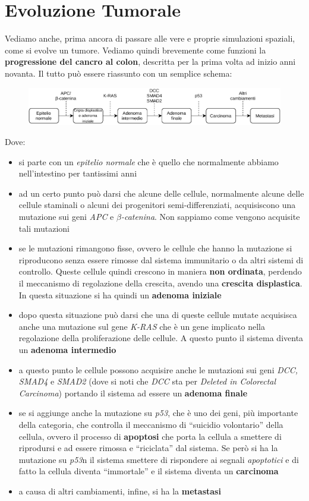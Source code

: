\documentclass[a4paper,12pt, oneside]{book}
\begin{document}
\section{Evoluzione Tumorale}
Vediamo anche, prima ancora di passare alle vere e proprie simulazioni spaziali,
come si evolve un tumore. Vediamo quindi brevemente come funzioni la
\textbf{progressione del cancro al colon}, descritta per la prima volta ad
inizio anni novanta. Il tutto può essere riassunto con un semplice schema:
\begin{figure}[H]
  \centering
  \includegraphics[scale = 0.8]{img/canc.pdf}
\end{figure}
Dove:
\begin{itemize}
  \item si parte con un \textit{epitelio normale} che è quello che normalmente
  abbiamo nell'intestino per tantissimi anni
  \item ad un certo punto può darsi che alcune delle cellule, normalmente alcune
  delle cellule staminali o alcuni dei progenitori semi-differenziati,
  acquisiscono una mutazione sui geni \textit{APC} e
  $\beta$\textit{-catenina}. Non sappiamo come vengono acquisite tali mutazioni 
  \item se le mutazioni rimangono fisse, ovvero le cellule che hanno la
  mutazione si riproducono senza essere rimosse dal sistema immunitario o da
  altri sistemi di controllo. Queste cellule quindi crescono in maniera
  \textbf{non ordinata}, perdendo il meccanismo di regolazione della crescita,
  avendo una \textbf{crescita displastica}. In questa situazione si ha quindi un
  \textbf{adenoma iniziale} 
  \item dopo questa situazione può darsi che una di queste cellule mutate
  acquisisca anche una mutazione sul gene \textit{K-RAS} che è un gene implicato
  nella regolazione della proliferazione delle cellule. A questo punto il
  sistema diventa un \textbf{adenoma intermedio}
  \item a questo punto le cellule possono acquisire anche le mutazioni sui geni
  \textit{DCC, SMAD4} e \textit{SMAD2} (dove si noti che \textit{DCC} sta per
  \textit{Deleted in Colorectal Carcinoma}) portando il sistema ad essere un
  \textbf{adenoma finale}
  \item se si aggiunge anche la mutazione su \textit{p53}, che è uno dei geni,
  più importante della categoria, che controlla il meccanismo di ``suicidio
  volontario'' della cellula, ovvero il processo di \textbf{apoptosi} che porta
  la cellula a smettere di riprodursi e ad essere rimossa e ``riciclata'' dal
  sistema. Se però si ha la mutazione su \textit{p53}n il sistema smettere di
  rispondere ai segnali \textit{apoptotici} e di fatto la cellula diventa
  ``immortale'' e il sistema diventa un \textbf{carcinoma}
  \item a causa di altri cambiamenti, infine, si ha la \textbf{metastasi}
\end{itemize}
\end{document}
